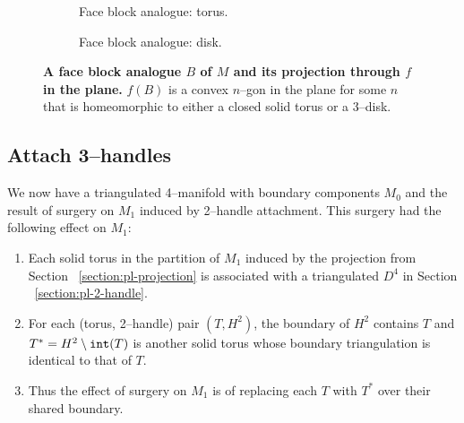 
\begin{figure}[h!]
	\begin{subfigure}[t]{0.45\textwidth}
		\caption{Face block analogue: torus.} \label{fig:regular-pl-block-torus}
	\end{subfigure}
	\hfill
	\begin{subfigure}[t]{0.45\textwidth}
		\caption{Face block analogue: disk.} \label{fig:regular-pl-block-disk}
	\end{subfigure}
	
	\caption{
		\textbf{A face block analogue $B$ of $M$ and its projection through $f$ in the plane.}
		$f(B)$ is a convex $n$--gon in the plane for some $n$ that is homeomorphic to either a closed solid torus or a 3--disk.
	}
	\label{fig:regular-pl-blocks}
\end{figure}


\subsection{Attach 3--handles}

We now have a triangulated 4--manifold with boundary components $M_0$ and the result of surgery on $M_1$ induced by 2--handle attachment.
This surgery had the following effect on $M_1$:
\begin{enumerate}
	\item Each solid torus in the partition of $M_1$ induced by the projection from Section ~\ref{section:pl-projection} is associated with a triangulated $D^4$ in Section ~\ref{section:pl-2-handle}.
	\item For each (torus, 2--handle) pair $(T, H^2)$, the boundary of $H^2$ contains $T$ and $T^* = H^2\setminus \texttt{int}(T)$ is another solid torus whose boundary triangulation is identical to that of $T$.
	\item Thus the effect of surgery on $M_1$ is of replacing each $T$ with $T^*$ over their shared boundary.
\end{enumerate}

